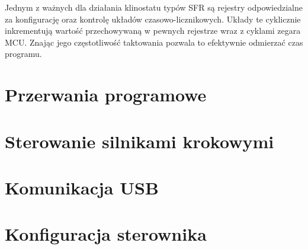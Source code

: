 Jednym z ważnych dla działania klinostatu typów SFR są rejestry odpowiedzialne za konfigurację oraz kontrolę układów czasowo-licznikowych. Układy te cyklicznie inkrementują wartość przechowywaną w pewnych rejestrze wraz z cyklami zegara MCU. Znając jego częstotliwość taktowania pozwala to efektywnie odmierzać czas programu.

\section{Przerwania programowe}

\section{Sterowanie silnikami krokowymi}

\section{Komunikacja USB}

\section{Konfiguracja sterownika}